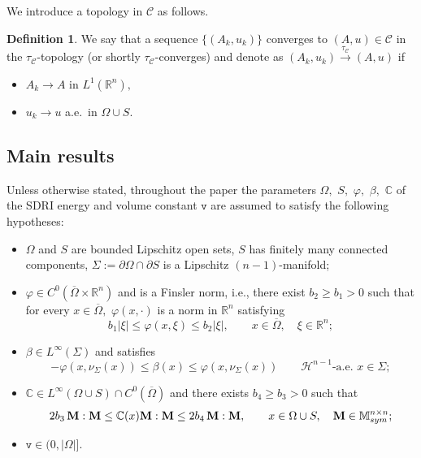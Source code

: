\documentclass[reqno]{amsart}
\numberwithin{equation}{section}
\theoremstyle{plain}
\theoremstyle{definition}
\newtheorem{definition}[theorem]{Definition}
\newcommand{\C}{\mathbb{C}}
\newcommand{\R}{\mathbb{R}}
\newcommand{\bM}{\mathbf{M}}
\newcommand{\fm}{\mathtt{v}}
\newcommand{\cH}{\mathcal{H}}
\newcommand{\p}{\partial}
\newcommand{\cl}[1]{\overline{#1}}
\newcommand{\bound}{b}
\newcommand{\mtwo}{\mathbb{M}^{n\times n}_{\rm sym}}
\newcommand{\admissible}{\mathcal{C}}
\newcommand{\substrate}{S}
\begin{document}
\noindent
We introduce a topology in $\admissible$ as follows.

\begin{definition}
We say that a sequence $\{(A_k,u_k)\}$ converges to $(A,u)\in\admissible$ in the $\tau_\admissible$-topology (or shortly $\tau_\admissible$-converges) and denote as $(A_k,u_k)\overset{\tau_\admissible}{\to}(A,u)$  if
\begin{itemize}
 \item $A_k\to A$ in $L^1(\R^n),$ 
 
 \item $u_k\to u$ a.e.\  in $\Omega\cup\substrate.$
\end{itemize}
\end{definition}


\subsection{Main results} \label{subsec:main_results}


Unless otherwise stated, throughout the paper the parameters  $\Omega,$ $\substrate,$ $\varphi,$ $\beta,$ $\C$ of the SDRI energy and volume constant $\fm$  are assumed to satisfy the following hypotheses:

%
\begin{itemize}
\item[(H0)] $\Omega$ and $\substrate$ are bounded Lipschitz open sets, $\substrate$ has finitely many connected components, $\Sigma:=\p\Omega\cap\p \substrate$ is a Lipschitz $(n-1)$-manifold; 

\item[(H1)] $\varphi\in C^0(\cl{\Omega}\times \R^n)$ and is a 
Finsler norm, i.e., there exist $\bound_2\ge \bound_1>0$ such that 
for every $x\in \cl{\Omega },$ $\varphi(x,\cdot)$ is a norm in $\R^n$ satisfying  
\begin{equation}\label{finsler_norm}
\bound_1|\xi| \le \varphi(x,\xi) \le \bound_2|\xi|,\qquad x\in\cl{\Omega},\quad \xi\in\R^n;
\end{equation}

\item[(H2)] $\beta\in L^\infty(\Sigma)$ and 
satisfies
\begin{equation}\label{hyp:bound_anis}
-\varphi(x,\nu_\Sigma(x))\le \beta(x) \le \varphi(x,\nu_\Sigma(x)) \qquad \text{$\cH^{n-1}$-a.e.\ $x\in \Sigma$};
\end{equation}

\item[(H3)] $\C\in L^\infty(\Omega\cup\substrate)\cap C^{0}(\cl{\Omega})$ and there exists $\bound_4\ge \bound_3>0$ such that 
\begin{equation}\label{hyp:elastic}
2\bound_3\,\bM:\bM \le \C(x)\bM:\bM \le 2\bound_4\,\bM:\bM, \qquad x\in\Omega\cup\substrate,\quad \bM\in\mtwo;
\end{equation}

\item[(H4)] $\fm\in(0,|\Omega|].$
\end{itemize}
\end{document}
